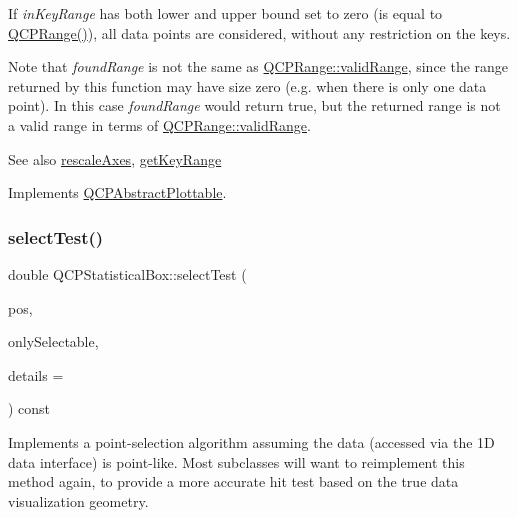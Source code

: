 If {\itshape in\+Key\+Range} has both lower and upper bound set to zero (is equal to {\ttfamily \hyperlink{class_q_c_p_range}{Q\+C\+P\+Range()}}), all data points are considered, without any restriction on the keys.

Note that {\itshape found\+Range} is not the same as \hyperlink{class_q_c_p_range_ab38bd4841c77c7bb86c9eea0f142dcc0}{Q\+C\+P\+Range\+::valid\+Range}, since the range returned by this function may have size zero (e.\+g. when there is only one data point). In this case {\itshape found\+Range} would return true, but the returned range is not a valid range in terms of \hyperlink{class_q_c_p_range_ab38bd4841c77c7bb86c9eea0f142dcc0}{Q\+C\+P\+Range\+::valid\+Range}.

\begin{DoxySeeAlso}{See also}
\hyperlink{class_q_c_p_abstract_plottable_a1491c4a606bccd2d09e65e11b79eb882}{rescale\+Axes}, \hyperlink{class_q_c_p_statistical_box_a77d2d13301dfe60c13adfaa17fc1802f}{get\+Key\+Range} 
\end{DoxySeeAlso}


Implements \hyperlink{class_q_c_p_abstract_plottable_a4de773988b21ed090fddd27c6a3a3dcb}{Q\+C\+P\+Abstract\+Plottable}.

\mbox{\label{class_q_c_p_statistical_box_a1607fa92f829c631107c20ccb2d70a6d}} 
\subsubsection{\texorpdfstring{select\+Test()}{selectTest()}}
{\footnotesize\ttfamily double Q\+C\+P\+Statistical\+Box\+::select\+Test (\begin{DoxyParamCaption}\item[{const Q\+PointF \&}]{pos,  }\item[{bool}]{only\+Selectable,  }\item[{Q\+Variant $\ast$}]{details = {} }\end{DoxyParamCaption}) const\hspace{0.3cm}{\ttfamily [virtual]}}

Implements a point-\/selection algorithm assuming the data (accessed via the 1D data interface) is point-\/like. Most subclasses will want to reimplement this method again, to provide a more accurate hit test based on the true data visualization geometry.

